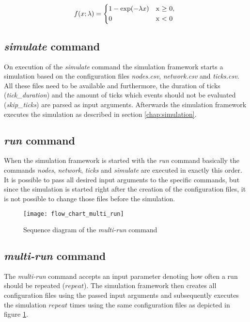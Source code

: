  \begin{equation} \label{eq:exponential}
f(x; \lambda) = \begin{cases*}
        1 - \exp(-\lambda x) & x  $\geq$ 0, \\
        0                                    &  x < 0
        \end{cases*}
\end{equation}

\subsection{\textit{simulate} command} \label{chap:simulate_command}

On execution of the \textit{simulate} command the simulation framework starts a simulation based on the configuration files \textit{nodes.csv}, \textit{network.csv} and \textit{ticks.csv}.
All these files need to be available and furthermore, the duration of ticks (\textit{tick\_duration}) and the amount of ticks which events should not be evaluated (\textit{skip\_ticks}) are parsed as input arguments.
Afterwards the simulation framework executes the simulation as described in section \ref{chap:simulation}.

\subsection{\textit{run} command} \label{chap:run_command}

When the simulation framework is started with the \textit{run} command basically the commands \textit{nodes}, \textit{network}, \textit{ticks} and \textit{simulate} are executed in exactly this order.
It is possible to pass all desired input arguments to the specific commands, but since the simulation is started right after the creation of the configuration files, it is not possible to change those files before the simulation.

\begin{figure}[t]
\texttt{[image: flow\_chart\_multi\_run]}
\centering
\caption{Sequence diagram of the \textit{multi-run} command}
\label{fig:flow_chart_multi_run}
\end{figure}

\subsection{\textit{multi-run} command} \label{chap:multi_run_command}

The \textit{multi-run} command accepts an input parameter denoting how often a run should be repeated ($repeat$).
The simulation framework then creates all configuration files using the passed input arguments and subsequently executes the simulation $repeat$ times using the same configuration files as depicted in figure \ref{fig:flow_chart_multi_run}.

